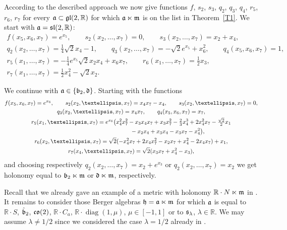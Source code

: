 \documentclass[11pt]{article}
\numberwithin{equation}{section}
\newcommand\fh{{\frak h}}
\newcommand\fm{{\frak m}}
\newcommand\fa{{\frak a}}
\newcommand\fb{{\frak b}}
\newcommand\fd{{\frak d}}
\newcommand\fs{{\frak s}}
\newcommand{\fgl}{\mathop{{\frak g \frak l}}}
\newcommand{\fsl}{\mathop{{\frak s \frak l}}}
\newcommand{\fco}{\mathop{{\frak c \frak o}}}
\newcommand\RR{{\mathbb R}}
\newcommand{\diag}{\operatorname{diag}}
\begin{document}
According to the described approach we now give functions $f$, $s_2$, $s_3$, $q_2$, $q_3$, $q_4$, $r_5$, $r_6$, $r_7$ for every $\fa\subset\fgl(2,\RR)$ for which $\fa\ltimes \fm$ is on the list in Theorem~\ref{T1}. We start with $\fa=\fsl(2,\RR)$:
\begin{gather*}
f(x_5,x_6,x_7) = e^{x_5},\qquad
s_2(x_2,\dots,x_7) = 0,\qquad
s_3(x_2,\dots,x_7) = x_2+x_4,\\
q_2(x_2,\dots,x_7) = \tfrac14 \sqrt2 x_4-1,\qquad
q_3(x_2,\dots,x_7) = -\sqrt2 e^{x_5}+x_6^2,\qquad
q_4(x_5,x_6,x_7) = 1,\\
r_5(x_1,\dots,x_7) = -\tfrac14 e^{x_5} \sqrt2 x_2x_4+x_6x_7,\qquad
r_6(x_1,\dots,x_7) = \tfrac12 x_3, \\
r_7(x_1,\dots,x_7) = \tfrac12 x_4^2- \sqrt2 x_2 .
\end{gather*}

We continue with $\fa\in \{\fb_2, \fd\}$. Starting with the functions
\begin{gather*}
f(x_5,x_6,x_7) = e^{x_6} ,\qquad
s_2(x_2,\dots, x_7) = x_4 x_7-x_4,\qquad
 s_3 (x_2, \dots, x_7) = 0,\\
q_3(x_2, \dots, x_7) = x_4 x_7,\qquad
q_4 (x_5,x_6,x_7) = x_7,\\
r_5(x_1,\dots, x_7) = e^{x_6} \big( x_4^2 x_7^2 - x_3 x_4 x_7 + x_3 x_7^2 - \tfrac23 x_4^3 + 2 x_4^2 x_7 - \tfrac { \sqrt{2}}2 x_1 \\
\hphantom{r_5(x_1,\dots, x_7) =}{} - x_2 x_4 + x_3 x_4 - x_3 x_7 - x_4^2\big),\\
r_6(x_2,\dots, x_7) = \sqrt{2} (-x_4^2 x_7 + 2 x_4 x_7^2 - x_2 x_7 + x_4^2 - 2 x_4 x_7) + x_1 ,\\
r_7(x_4,\dots, x_7) = \sqrt 2 (x_3 x_7 + x_4^2 - x_3),
\end{gather*}
and choosing respectively $q_2 (x_2, \dots, x_7) = x_2 + e^{x_3}$ or $q_2 (x_2, \dots, x_7) = x_2 $ we get holonomy equal to $\fb_2\ltimes \fm $ or $\fd\ltimes \fm$, respectively.

Recall that we already gave an example of a metric with holonomy $\RR\cdot N\ltimes \fm$ in \cite{FK}. It remains to consider those Berger algebras $\fh=\fa\ltimes \fm$ for which $\fa$ is equal to $\RR\cdot S$, $\hat \fb_2$, $\fco(2)$, $\RR\cdot C_a$, $\RR\cdot\diag(1,\mu)$, $\mu\in[-1,1]$ or to $\fs_\lambda$, $\lambda\in\RR$. We may assume $\lambda\not=1/2$ since we considered the case $\lambda=1/2$ already in \cite{FK}.
\end{document}
